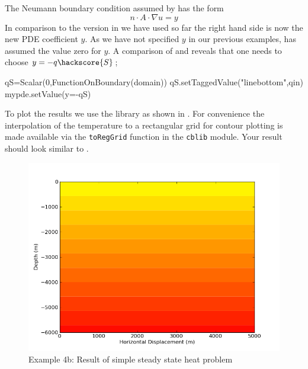 The Neumann boundary condition assumed by \esc has the form
\begin{equation}\label{NEUMAN 2b}
n\cdot A \cdot\nabla u = y 
\end{equation}
In comparison to the version in  we have used so far the right
hand side is now the new PDE coefficient $y$. As we have not specified $y$ in
our previous examples, \esc has assumed the value zero for $y$. A comparison of
 and  reveals that one needs to choose
$y=-q\hackscore{S}$;
\begin{python}
qS=Scalar(0,FunctionOnBoundary(domain))
qS.setTaggedValue("linebottom",qin)
mypde.setValue(y=-qS)
\end{python}
To plot the results we use the \modmpl library as shown in
. For convenience the interpolation of the temperature to
a rectangular grid for contour plotting is made available via the
\verb|toRegGrid| function in the \verb|cblib| module. Your result should look
similar to .

\begin{figure}[ht]
\centerline{\includegraphics[width=4.in]{figures/simpleheat}}
\caption{Example 4b: Result of simple steady state heat problem}
\label{fig:steady state heat}
\end{figure}
\clearpage

